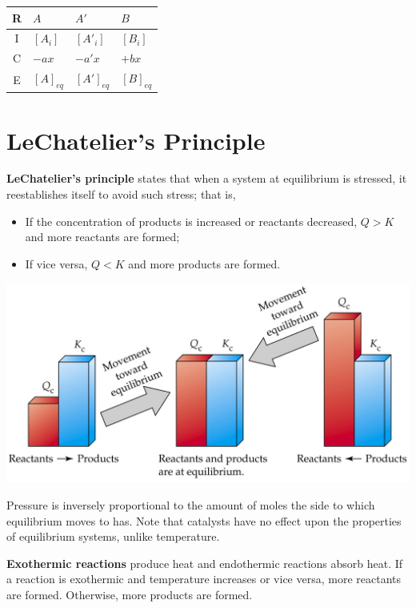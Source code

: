 \documentclass{tufte-book}
\renewcommand{\emph}[1]{\textbf{#1}}
\begin{document}
\begin{center}
  \begin{tabular}{clll}
    R & $A$ & $A'$ & $B$ \\
    \hline
    I & $[A_i]$ & $[A'_i]$ & $[B_i]$ \\
    C & $-ax$ & $-a'x$ &  $+bx$ \\
    E & $[A]_{eq}$ & $[A']_{eq}$ & $[B]_{eq}$
  \end{tabular}
\end{center}

\section{LeChatelier's Principle}

\emph{LeChatelier's principle} states that when a system at equilibrium is stressed, it reestablishes itself to avoid such stress; that is,
\begin{itemize}
  \item If the concentration of products is increased or reactants decreased, $Q>K$ and more reactants are formed;
  \item If vice versa, $Q<K$ and more products are formed.
\end{itemize}
%
\begin{marginfigure}[5mm]
\begin{center}
  \includegraphics[width=\textwidth]{qk}
\end{center}
\end{marginfigure}
%
Pressure is inversely proportional to the amount of moles the side to which equilibrium moves to has. Note that catalysts have no effect upon the properties of equilibrium systems, unlike temperature.

\bigskip
\emph{Exothermic reactions} produce heat and endothermic reactions absorb heat. If a reaction is exothermic and temperature increases or vice versa, more reactants are formed. Otherwise, more products are formed.
\end{document}
